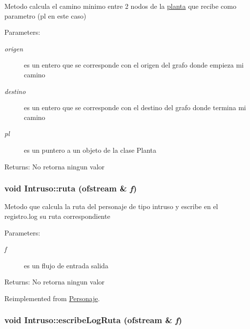 Metodo calcula el camino minimo entre 2 nodos de la \hyperlink{classplanta}{planta} que recibe como parametro (pl en este caso) \begin{Desc}
\item[Parameters:]
\begin{description}
\item[{\em origen}]es un entero que se corresponde con el origen del grafo donde empieza mi camino \item[{\em destino}]es un entero que se corresponde con el destino del grafo donde termina mi camino \item[{\em pl}]es un puntero a un objeto de la clase Planta \end{description}
\end{Desc}
\begin{Desc}
\item[Returns:]No retorna ningun valor \end{Desc}
\hypertarget{classIntruso_2898ae82386e99d361f6f131122b7be1}{
\subsubsection[ruta]{\setlength{\rightskip}{0pt plus 5cm}void Intruso::ruta (ofstream \& {\em f})}}
\label{classIntruso_2898ae82386e99d361f6f131122b7be1}


Metodo que calcula la ruta del personaje de tipo intruso y escribe en el registro.log su ruta correspondiente \begin{Desc}
\item[Parameters:]
\begin{description}
\item[{\em f}]es un flujo de entrada salida \end{description}
\end{Desc}
\begin{Desc}
\item[Returns:]No retorna ningun valor \end{Desc}


Reimplemented from \hyperlink{classPersonaje_f6dc20013805229005dfb87fc6f273b5}{Personaje}.\hypertarget{classIntruso_0f0142b1852ed9f0431af335d3ff6f14}{
\subsubsection[escribeLogRuta]{\setlength{\rightskip}{0pt plus 5cm}void Intruso::escribeLogRuta (ofstream \& {\em f})}}
\label{classIntruso_0f0142b1852ed9f0431af335d3ff6f14}


